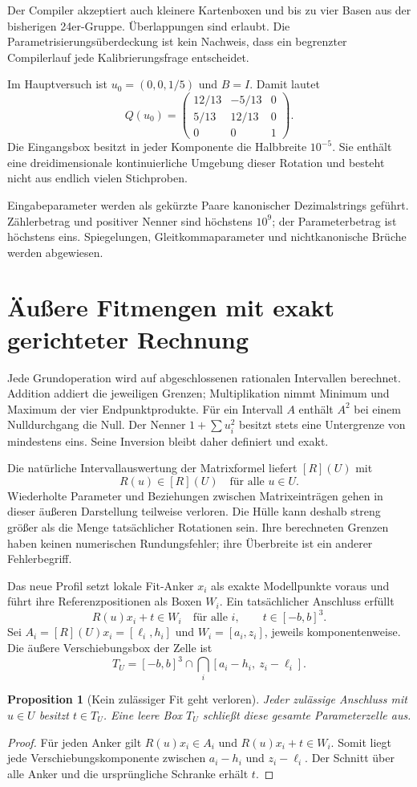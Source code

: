 \documentclass[11pt,a4paper]{article}
\newcommand{\nextsection}[2]{\clearpage{\color{accent}\small\textsf{#1}}\section{#2}}
\newtheorem{proposition}{Proposition}[section]
\begin{document}
Der Compiler akzeptiert auch kleinere Kartenboxen und bis zu vier
Basen aus der bisherigen 24er-Gruppe. Überlappungen sind erlaubt.
Die Parametrisierungsüberdeckung ist kein Nachweis, dass ein
begrenzter Compilerlauf jede Kalibrierungsfrage entscheidet.

Im Hauptversuch ist $u_0=(0,0,1/5)$ und $B=I$. Damit lautet
\[
Q(u_0)=\begin{pmatrix}12/13&-5/13&0\\5/13&12/13&0\\0&0&1\end{pmatrix}.
\]
Die Eingangsbox besitzt in jeder Komponente die Halbbreite $10^{-5}$.
Sie enthält eine dreidimensionale kontinuierliche Umgebung dieser
Rotation und besteht nicht aus endlich vielen Stichproben.

Eingabeparameter werden als gekürzte Paare kanonischer Dezimalstrings
geführt. Zählerbetrag und positiver Nenner sind höchstens $10^9$;
der Parameterbetrag ist höchstens eins. Spiegelungen,
Gleitkommaparameter und nichtkanonische Brüche werden abgewiesen.

\nextsection{99 / INTERVALLGEOMETRIE}{Äußere Fitmengen mit exakt gerichteter Rechnung}
Jede Grundoperation wird auf abgeschlossenen rationalen Intervallen
berechnet. Addition addiert die jeweiligen Grenzen; Multiplikation
nimmt Minimum und Maximum der vier Endpunktprodukte. Für ein
Intervall $A$ enthält $A^2$ bei einem Nulldurchgang die Null.
Der Nenner $1+\sum u_i^2$ besitzt stets eine Untergrenze von
mindestens eins. Seine Inversion bleibt daher definiert und exakt.

Die natürliche Intervallauswertung der Matrixformel liefert
$[R](U)$ mit
\[
 R(u)\in[R](U)\quad\text{für alle }u\in U.
\]
Wiederholte Parameter und Beziehungen zwischen Matrixeinträgen
gehen in dieser äußeren Darstellung teilweise verloren. Die Hülle
kann deshalb streng größer als die Menge tatsächlicher Rotationen
sein. Ihre berechneten Grenzen haben keinen numerischen
Rundungsfehler; ihre Überbreite ist ein anderer Fehlerbegriff.

Das neue Profil setzt lokale Fit-Anker $x_i$ als exakte Modellpunkte
voraus und führt ihre Referenzpositionen als Boxen $W_i$.
Ein tatsächlicher Anschluss erfüllt
\[
 R(u)x_i+t\in W_i\quad\text{für alle }i,\qquad t\in[-b,b]^3.
\]
Sei $A_i=[R](U)x_i=[\ell_i,h_i]$ und
$W_i=[a_i,z_i]$, jeweils komponentenweise. Die äußere
Verschiebungsbox der Zelle ist
\[
 T_U=[-b,b]^3\cap\bigcap_i[a_i-h_i,\ z_i-\ell_i].
\]
\begin{proposition}[Kein zulässiger Fit geht verloren]
Jeder zulässige Anschluss mit $u\in U$ besitzt $t\in T_U$.
Eine leere Box $T_U$ schließt diese gesamte Parameterzelle aus.
\end{proposition}
\begin{proof}
Für jeden Anker gilt $R(u)x_i\in A_i$ und
$R(u)x_i+t\in W_i$. Somit liegt jede Verschiebungskomponente
zwischen $a_i-h_i$ und $z_i-\ell_i$. Der Schnitt über alle
Anker und die ursprüngliche Schranke erhält $t$.
\end{proof}
\end{document}
